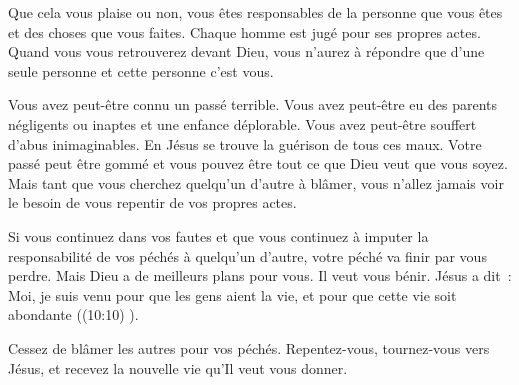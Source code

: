 Que cela vous plaise ou non, vous êtes responsables de la personne
 que vous êtes et des choses que vous faites.
 Chaque homme est jugé pour ses propres actes.
 Quand vous vous retrouverez devant Dieu, 
 vous n'aurez à répondre que d'une seule personne
 \ocadr et cette personne c'est vous. 


Vous avez peut-être connu un passé terrible.
 Vous avez peut-être eu des parents négligents ou inaptes
 et une enfance déplorable. Vous avez peut-être souffert
 d'abus inimaginables. En Jésus se trouve la guérison de tous ces maux.
 Votre passé peut être gommé et vous pouvez être tout ce que Dieu
 veut que vous soyez. Mais tant que vous cherchez 
 quelqu'un d'autre à blâmer, vous n'allez jamais voir le besoin
 de vous repentir de vos propres actes. 

Si vous continuez dans vos fautes et que vous continuez
 à imputer la responsabilité de vos péchés à quelqu'un d'autre,
 votre péché va finir par vous perdre.
 Mais Dieu a de meilleurs plans pour vous. Il veut vous bénir.
 Jésus a dit~: 
 \og Moi, je suis venu pour que les gens aient la vie,
 et pour que cette vie soit abondante \fg{} ((10:10) \BFC). 

Cessez de blâmer les autres pour vos péchés.
 Repentez-vous, tournez-vous vers Jésus,
 et recevez la nouvelle vie qu'Il veut vous donner. 

\dvrule





